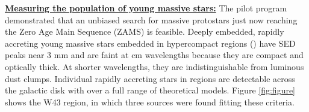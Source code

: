 \documentclass[11pt,preprint]{aastex_nofoot}
\begin{document}
% 
% 




\underline{\textbf{\helv Measuring the population of young massive stars:}}
The pilot program demonstrated that an unbiased search for massive protostars
just now reaching the Zero Age Main Sequence (ZAMS) is feasible.  Deeply
embedded, rapidly accreting young massive stars embedded in hypercompact \hii regions (\hchii) have
SED peaks near 3 mm and are faint at cm wavelengths because they
are compact and optically thick.  At shorter wavelengths, they are
indistinguishable from luminous dust clumps.  Individual rapidly accreting
stars in \hchii regions are  detectable across the galactic disk with
\MUSTANG over a full range of theoretical models.  Figure \ref{fig:figure}
shows the W43 region, in which three sources were found fitting these criteria.
\end{document}

